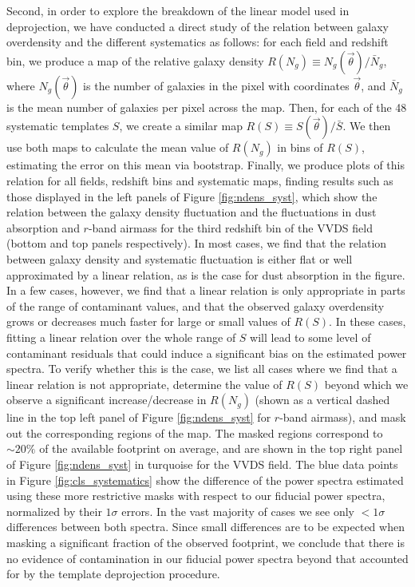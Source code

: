 \documentclass[a4paper,11pt]{article}
\newcommand{\nv}{\vec{\theta}}
\begin{document}
      Second, in order to explore the breakdown of the linear model used in deprojection, we have conducted a direct study of the relation between galaxy overdensity and the different systematics as follows: for each field and redshift bin, we produce a map of the relative galaxy density $R(N_g)\equiv N_g(\nv)/\bar{N}_g$, where $N_g(\nv)$ is the number of galaxies in the pixel with coordinates $\nv$, and $\bar{N}_g$ is the mean number of galaxies per pixel across the map. Then, for each of the 48 systematic templates $S$, we create a similar map $R(S)\equiv S(\nv)/\bar{S}$. We then use both maps to calculate the mean value of $R(N_g)$ in bins of $R(S)$, estimating the error on this mean via bootstrap. Finally, we produce plots of this relation for all fields, redshift bins and systematic maps, finding results such as those displayed in the left panels of Figure \ref{fig:ndens_syst}, which show the relation between the galaxy density fluctuation and the fluctuations in dust absorption and $r$-band airmass for the third redshift bin of the VVDS field (bottom and top panels respectively). In most cases, we find that the relation between galaxy density and systematic fluctuation is either flat or well approximated by a linear relation, as is the case for dust absorption in the figure. In a few cases, however, we find that a linear relation is only appropriate in parts of the range of contaminant values, and that the observed galaxy overdensity grows or decreases much faster for large or small values of $R(S)$. In these cases, fitting a linear relation over the whole range of $S$ will lead to some level of contaminant residuals that could induce a significant bias on the estimated power spectra. To verify whether this is the case, we list all cases where we find that a linear relation is not appropriate, determine the value of $R(S)$ beyond which we observe a significant increase/decrease in $R(N_g)$ (shown as a vertical dashed line in the top left panel of Figure \ref{fig:ndens_syst} for $r$-band airmass), and mask out the corresponding regions of the map. The masked regions correspond to $\sim20\%$ of the available footprint on average, and are shown in the top right panel of Figure \ref{fig:ndens_syst} in turquoise for the VVDS field. The blue data points in Figure \ref{fig:cls_systematics} show the difference of the power spectra estimated using these more restrictive masks with respect to our fiducial power spectra, normalized by their $1\sigma$ errors. In the vast majority of cases we see only $<1\sigma$ differences between both spectra. Since small differences are to be expected when masking a significant fraction of the observed footprint, we conclude that there is no evidence of contamination in our fiducial power spectra beyond that accounted for by the template deprojection procedure.
\end{document}
